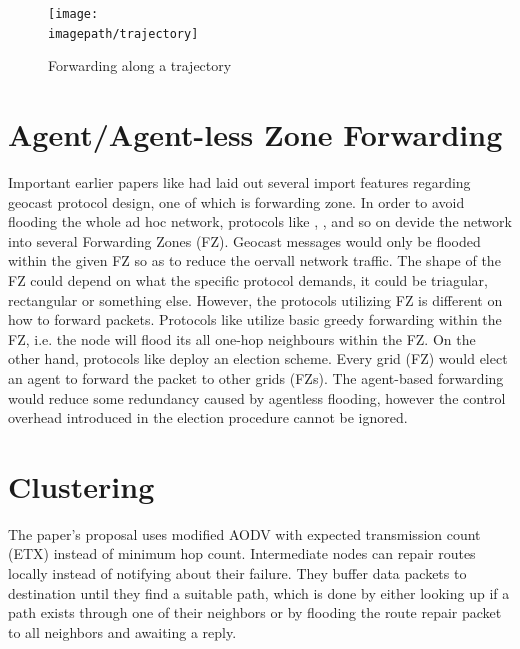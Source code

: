\documentclass[conference]{IEEEtran}
\newcommand{\imagepath}{../../images/external/location_routing}
\begin{document}
\begin{figure}
\label{fig:trajectory}
\centering
\texttt{[image: \\imagepath/trajectory]}
\caption{Forwarding along a trajectory}
\end{figure}

\section{Agent/Agent-less Zone Forwarding}

Important earlier papers like \cite{Basagni1998} had laid out several import features regarding geocast protocol design, one of which is forwarding zone. In order to avoid flooding the whole ad hoc network, protocols like \cite{Basagni1998}, \cite{Camp2003}, \cite{Liao} and so on devide the network into several Forwarding Zones (FZ). Geocast messages would 
only be flooded within the given FZ so as to reduce the oervall network traffic. The shape of the FZ could depend on what the specific protocol demands, it could be triagular, rectangular or something else. However, the protocols utilizing FZ is different on how to forward packets. Protocols like \cite{Basagni1998} utilize basic greedy forwarding within
the FZ, i.e. the node will flood its all one-hop neighbours within the FZ. On the other hand, protocols like \cite{Liao} deploy an election scheme. Every grid (FZ) would elect an agent to forward the packet to other grids (FZs). The agent-based forwarding would reduce some redundancy caused by agentless flooding, however the control overhead 
introduced in the election procedure cannot be ignored.


\section{Clustering}

\cite{Al-Rabayah2010} The paper's proposal uses modified AODV with expected transmission count (ETX) instead of minimum hop count.
Intermediate nodes can repair routes locally instead of notifying about their failure.
They buffer data packets to destination until they find a suitable path, which is done by either looking up if a path exists through one of their neighbors or by flooding the route repair packet to all neighbors and awaiting a reply.
\end{document}
